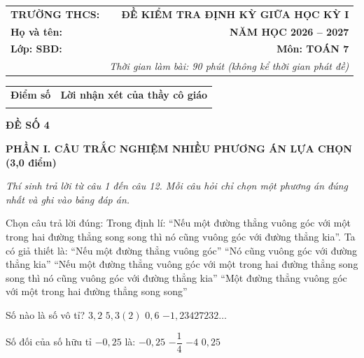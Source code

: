 \documentclass[12pt,a4paper]{article}
\begin{document}
\noindent
\begin{tabularx}{\linewidth}{X r}
\textbf{TRƯỜNG THCS: \dotfill} & \textbf{ĐỀ KIỂM TRA ĐỊNH KỲ GIỮA HỌC KỲ I} \\
\textbf{Họ và tên: \dotfill} & \textbf{NĂM HỌC 2026 -- 2027} \\
\textbf{Lớp: \dotfill \quad SBD: \dotfill} & \textbf{Môn: TOÁN 7} \\
& \textit{Thời gian làm bài: 90 phút (không kể thời gian phát đề)}
\end{tabularx}

\vspace{1.5mm}
\noindent
\begin{tabularx}{\linewidth}{|p{3.5cm}|X|}
\hline
\centering\textbf{Điểm số} & \centering\textbf{Lời nhận xét của thầy cô giáo} \tabularnewline
\rule{0pt}{1.6cm} & \\
\hline
\end{tabularx}

\vspace{2.5mm}
\begin{center}
\textbf{\large ĐỀ SỐ 4}
\end{center}

\noindent\textbf{\large PHẦN I. CÂU TRẮC NGHIỆM NHIỀU PHƯƠNG ÁN LỰA CHỌN (3,0 điểm)}

\textit{Thí sinh trả lời từ câu 1 đến câu 12. Mỗi câu hỏi chỉ chọn một phương án đúng nhất và ghi vào bảng đáp án.}

\vspace{1mm}
\begin{ex}
Chọn câu trả lời đúng: Trong định lí: ``Nếu một đường thẳng vuông góc với một trong hai đường thẳng song song thì nó cũng vuông góc với đường thẳng kia''. Ta có giả thiết là:
\choice
{``Nếu một đường thẳng vuông góc''}
{``Nó cũng vuông góc với đường thẳng kia''}
{``Nếu một đường thẳng vuông góc với một trong hai đường thẳng song song thì nó cũng vuông góc với đường thẳng kia''}
{\True ``Một đường thẳng vuông góc với một trong hai đường thẳng song song''}
\end{ex}

\begin{ex}
Số nào là số vô tỉ?
\choice
{$3{,}2$}
{$5{,}3(2)$}
{$0{,}6$}
{\True $-1{,}23427232\dots$}
\end{ex}

\begin{ex}
Số đối của số hữu tỉ $-0{,}25$ là:
\choice
{$-0{,}25$}
{$-\dfrac{1}{4}$}
{$-4$}
{\True $0{,}25$}
\end{ex}
\end{document}

